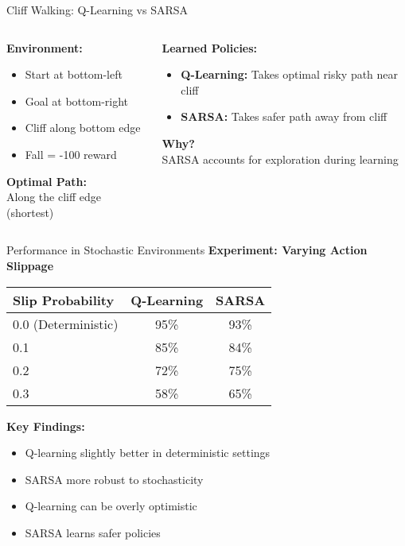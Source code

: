 \documentclass[aspectratio=169,10pt]{beamer}
\begin{document}
\begin{frame}{Cliff Walking: Q-Learning vs SARSA}
\begin{columns}[T]
\begin{column}{0.5\textwidth}
\textbf{Environment:}
\begin{itemize}
    \item Start at bottom-left
    \item Goal at bottom-right
    \item Cliff along bottom edge
    \item Fall = -100 reward
\end{itemize}

\vspace{1em}
\textbf{Optimal Path:}\\
Along the cliff edge (shortest)
\end{column}
\begin{column}{0.5\textwidth}
\textbf{Learned Policies:}
\begin{itemize}
    \item \textbf{Q-Learning:} Takes optimal risky path near cliff
    \item \textbf{SARSA:} Takes safer path away from cliff
\end{itemize}

\vspace{1em}
\textbf{Why?}\\
SARSA accounts for exploration during learning
\end{column}
\end{columns}
\end{frame}

\begin{frame}{Performance in Stochastic Environments}
\textbf{Experiment: Varying Action Slippage}

\begin{center}
\begin{tabular}{|l|c|c|}
\hline
\textbf{Slip Probability} & \textbf{Q-Learning} & \textbf{SARSA} \\
\hline
0.0 (Deterministic) & 95\% & 93\% \\
0.1 & 85\% & 84\% \\
0.2 & 72\% & 75\% \\
0.3 & 58\% & 65\% \\
\hline
\end{tabular}
\end{center}

\textbf{Key Findings:}
\begin{itemize}
    \item Q-learning slightly better in deterministic settings
    \item SARSA more robust to stochasticity
    \item Q-learning can be overly optimistic
    \item SARSA learns safer policies
\end{itemize}
\end{frame}
\end{document}
